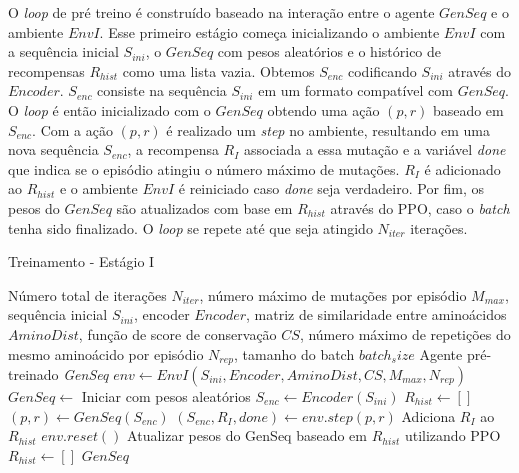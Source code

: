 O \textit{loop} de pré treino é construído baseado na interação entre o agente $GenSeq$ e o ambiente $EnvI$.
Esse primeiro estágio começa inicializando o ambiente $EnvI$ com a sequência inicial $S_{ini}$, o 
$GenSeq$ com pesos aleatórios e o histórico de recompensas $R_{hist}$ como uma lista vazia. 
Obtemos $S_{enc}$ codificando $S_{ini}$ através do $Encoder$. 
$S_{enc}$ consiste na sequência $S_{ini}$ em um formato compatível com $GenSeq$. 
O \textit{loop} é então inicializado com o $GenSeq$ obtendo uma ação $(p,r)$ baseado em $S_{enc}$.
Com a ação $(p,r)$ é realizado um \textit{step} no ambiente, resultando em uma nova sequência $S_{enc}$, a recompensa $R_{I}$ associada 
a essa mutação e a variável \textit{done} que indica se o episódio atingiu o número máximo de mutações. 
$R_{I}$ é adicionado ao $R_{hist}$ e o ambiente $EnvI$ é reiniciado caso \textit{done} seja verdadeiro. 
Por fim, os pesos do $GenSeq$ são atualizados com base em $R_{hist}$ através do PPO, caso o \textit{batch} tenha sido finalizado. 
O \textit{loop} se repete até que seja atingido $N_{iter}$ iterações. 


\begin{algorithm}[H]
  \caption{Treinamento - Estágio I}
  \label{alg:train_stage1}
  \begin{algorithmic}[1]
  \Require Número total de iterações $N_{iter}$, 
  \State         número máximo de mutações por episódio $M_{max}$, 
  \State         sequência inicial $S_{ini}$,
  \State         encoder $Encoder$,
  \State         matriz de similaridade entre aminoácidos $\textit{AminoDist}$,
  \State         função de score de conservação $CS$,
  \State         número máximo de repetições do mesmo aminoácido por episódio $N_{rep}$,
  \State         tamanho do batch $batch_size$
  \Ensure Agente pré-treinado \textit{GenSeq}
  \State $env \gets EnvI(S_{ini}, Encoder, \textit{AminoDist}, CS, M_{max}, N_{rep})$ 
  \State $GenSeq \gets$ Iniciar com pesos aleatórios
  \State $S_{enc} \gets Encoder(S_{ini})$ 
  \State $R_{hist} \gets []$ 
      \State $(p,r) \gets GenSeq(S_{enc})$ 
      \State $(S_{enc}, R_{I}, done) \gets env.step(p, r)$ 
      \State Adiciona $R_{I}$ ao $R_{hist}$ 
          \State $env.reset()$ 
      \EndIf
          \State Atualizar pesos do GenSeq baseado em $R_{hist}$ utilizando PPO
          \State $R_{hist} \gets []$
      \EndIf
  \EndFor
  \State \Return $GenSeq$
  \end{algorithmic}
\end{algorithm}

